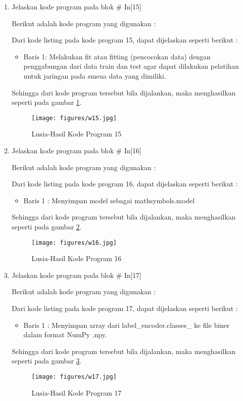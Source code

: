 \begin{enumerate}
\item Jelaskan kode program pada blok \# In[15]
\par Berikut adalah kode program yang digunakan :
	
	\par Dari kode listing pada kode program 15, dapat dijelaskan seperti berikut :
	\begin{itemize}
	\item Baris 1: Melakukan fit atau fitting (pencocokan data) dengan penggabungan dari data train dan test agar dapat dilakukan pelatihan untuk jaringan pada smeua data yang dimiliki.
	\end{itemize}
	\par Sehingga dari kode program tersebut bila dijalankan, maka menghasilkan seperti pada gambar \ref{7B15}.
		\begin{figure}[!hbtp]
		\centering
		\texttt{[image: figures/w15.jpg]}
		\caption{Lusia-Hasil Kode Program 15}
		\label{7B15}
		\end{figure}

\item Jelaskan kode program pada blok \# In[16]
\par Berikut adalah kode program yang digunakan :
	
	\par Dari kode listing pada kode program 16, dapat dijelaskan seperti berikut :
	\begin{itemize}
	\item Baris 1	: Menyimpan model sebagai mathsymbols.model
	\end{itemize}
	\par Sehingga dari kode program tersebut bila dijalankan, maka menghasilkan seperti pada gambar \ref{7B16}.
		\begin{figure}[!hbtp]
		\centering
		\texttt{[image: figures/w16.jpg]}
		\caption{Lusia-Hasil Kode Program 16}
		\label{7B16}
		\end{figure}

\item Jelaskan kode program pada blok \# In[17]
	\par Berikut adalah kode program yang digunakan :
	
	\par Dari kode listing pada kode program 17, dapat dijelaskan seperti berikut :
	\begin{itemize}
	\item Baris 1	: Menyimpan array dari label\_encoder.classes\_ ke file biner dalam format NumPy .npy.
	\end{itemize}
	\par Sehingga dari kode program tersebut bila dijalankan, maka menghasilkan seperti pada gambar \ref{7B17}.
		\begin{figure}[!hbtp]
		\centering
		\texttt{[image: figures/w17.jpg]}
		\caption{Lusia-Hasil Kode Program 17}
		\label{7B17}
		\end{figure}


\end{enumerate}
